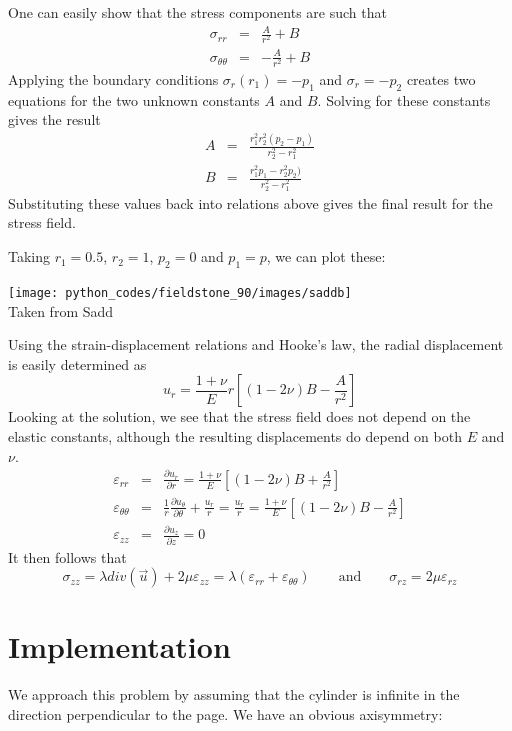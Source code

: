 One can easily show that the stress components are such that
\begin{eqnarray}
\sigma_{rr} &=& \frac{A}{r^2} + B \\
\sigma_{\theta\theta} &=& -\frac{A}{r^2} + B
\end{eqnarray}
Applying the boundary conditions 
$\sigma_r(r_1)=-p_1$ and $\sigma_r=-p_2$ 
creates two equations
for the two unknown constants $A$ and $B$. 
Solving for these constants gives the result
\begin{eqnarray}
A &=& \frac{r_1^2r_2^2(p_2-p_1)}{r_2^2-r_1^2} \\
B &=& \frac{r_1^2p_1-r_2^2p_2 )}{r_2^2-r_1^2} 
\end{eqnarray}
Substituting these values back into relations above gives the final result for the stress field.

Taking $r_1=0.5$, $r_2=1$, $p_2=0$ and $p_1=p$, we can plot these:
\begin{center}
\texttt{[image: python\_codes/fieldstone\_90/images/saddb]}\\
{\captionfont Taken from Sadd \cite{sadd14}}
\end{center}

Using the strain-displacement relations and Hooke's law, the radial
displacement is easily determined as
\[
u_r = \frac{1+\nu}{E}r \left[ (1-2\nu) B - \frac{A}{r^2}\right]
\]
Looking at the solution, we see that 
the stress field does not depend on the elastic constants, although the
resulting displacements do depend on both $E$ and $\nu$.
\begin{eqnarray}
\varepsilon_{rr} &=& \frac{\partial u_r}{\partial r} = 
\frac{1+\nu}{E} \left[ (1-2\nu) B + \frac{A}{r^2}\right]
\\
\varepsilon_{\theta\theta} &=& \frac1r \frac{\partial u_\theta}{\partial \theta} + \frac{u_r}{r} 
=\frac{u_r}{r}  
=\frac{1+\nu}{E} \left[ (1-2\nu) B - \frac{A}{r^2}\right] 
\\
\varepsilon_{zz} &=& \frac{\partial u_z}{\partial z} = 0 
\end{eqnarray}
It then follows that 
\[
\sigma_{zz} = \lambda div(\vec{u}) + 2 \mu \varepsilon_{zz} = 
\lambda (\varepsilon_{rr} + \varepsilon_{\theta\theta})
\qquad
\text{and}
\qquad
\sigma_{rz} = 2 \mu \varepsilon_{rz} 
\]

\section*{Implementation}

We approach this problem by assuming that the cylinder is infinite in the direction perpendicular 
to the page. We have an obvious axisymmetry: 


